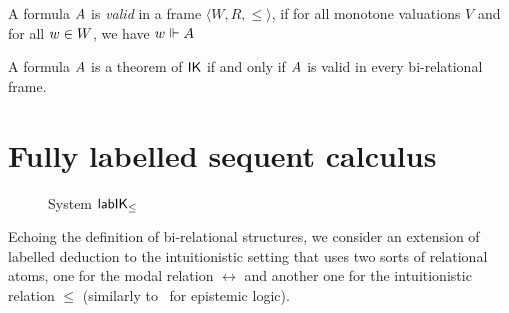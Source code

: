 \documentclass[twoside]{aiml20}
\begin{document}
\begin{definition}
	A formula $A$ is \emph{valid} in a frame $\langle W, R, \le \rangle$, if for all monotone valuations $V$ and for all $w \in W$, we have $w \Vdash A$
\end{definition}


\begin{theorem}\label{thm:plotkin}
	A formula $A$ is a theorem of $\mathsf{IK}$ if and only if $A$ is valid in every bi-relational frame.
\end{theorem}

\section{Fully labelled sequent calculus}\label{sec:labelled}

\begin{figure}
	\centering
	\caption{System $\mathsf{lab}\mathsf{IK}_{\le}$}
	\label{fig:labIK}
\end{figure}


%
%
%
Echoing the definition of bi-relational structures, we consider an extension of labelled deduction to the intuitionistic setting
%
that uses two sorts of relational atoms, one for the modal relation $\rel$ and another one for the intuitionistic relation $\leq$ (similarly to~\cite{maffezioli2013} for epistemic logic). 
%
\end{document}

